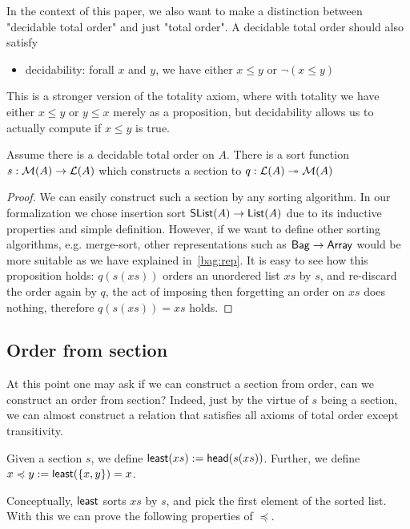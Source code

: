 In the context of this paper, we also want to make a distinction between "decidable total order"
and just "total order". A decidable total order should also satisfy
\begin{itemize}
    \item decidability: forall $x$ and $y$, we have either $x \leq y$ or $\neg(x \leq y)$ 
\end{itemize}

This is a stronger version of the totality axiom, where with totality we have 
either $x \leq y$ or $y \leq x$ merely as a proposition, but decidability allows us to actually
compute if $x \leq y$ is true.

\begin{proposition}
Assume there is a decidable total order on $A$. There is a sort function $s: \mathcal{M}(A) \to \mathcal{L}(A)$
which constructs a section to $q : \mathcal{L}(A) \twoheadrightarrow \mathcal{M}(A)$
\end{proposition}

\begin{proof}
We can easily construct such a section by any sorting algorithm. In our formalization we chose
insertion sort $\operatorname{\mathsf{SList}}(A) \to \operatorname{\mathsf{List}}(A)$ due to its inductive properties and simple definition.
However, if we want to define other sorting algorithms, e.g. merge-sort,
other representations such as $\operatorname{\mathsf{Bag}} \to \operatorname{\mathsf{Array}}$ would be more suitable as we have explained in~\ref{bag:rep}.
It is easy to see how this
proposition holds: $q(s(xs))$ orders an unordered list $xs$ by $s$, and re-discard the order again by
$q$, the act of imposing then forgetting an order on $xs$ does nothing, therefore $q(s(xs)) = xs$ holds.
\end{proof}


\subsection{Order from section}
At this point one may ask if we can construct a section from order, can we construct an order from section?
Indeed, just by the virtue of $s$ being a section, we can almost construct a relation that satisfies
all axioms of total order except transitivity. 

\begin{definition}
Given a section $s$, we define $\operatorname{\mathsf{least}}(xs) := \operatorname{\mathsf{head}}(s(xs))$.
Further, we define $x \preccurlyeq y := \operatorname{\mathsf{least}}(\{x, y\}) = x$. 
\end{definition}

Conceptually, $\operatorname{\mathsf{least}}$ sorts $xs$ by $s$, and pick the first element of the sorted list.
With this we can prove the following properties of $\preccurlyeq$.

